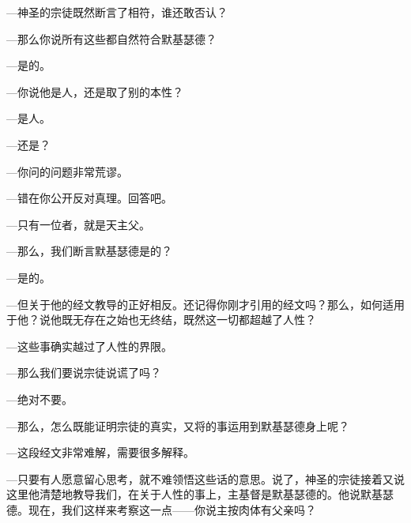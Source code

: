 —神圣的宗徒既然断言了相符，谁还敢否认？\par

—那么你说所有这些都自然符合默基瑟德？\par

—是的。\par

—你说他是人，还是取了别的本性？\par

—是人。\par

—还是？\par

—你问的问题非常荒谬。\par

—错在你公开反对真理。回答吧。\par

—只有一位者，就是天主父。\par

—那么，我们断言默基瑟德是的？\par

—是的。\par

—但关于他的经文教导的正好相反。还记得你刚才引用的经文吗？那么，如何适用于他？说他既无存在之始也无终结，既然这一切都超越了人性？\par

—这些事确实越过了人性的界限。\par

—那么我们要说宗徒说谎了吗？\par

—绝对不要。\par

—那么，怎么既能证明宗徒的真实，又将的事运用到默基瑟德身上呢？\par

—这段经文非常难解，需要很多解释。\par

—只要有人愿意留心思考，就不难领悟这些话的意思。说了，神圣的宗徒接着又说这里他清楚地教导我们，在关于人性的事上，主基督是默基瑟德的。他说默基瑟德。现在，我们这样来考察这一点——你说主按肉体有父亲吗？\par

